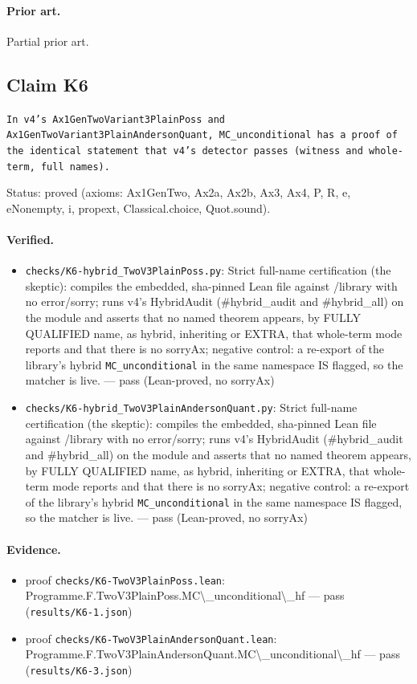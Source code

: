 \documentclass{article}
\begin{document}
\paragraph{Prior art.} Partial prior art.

\subsection*{Claim K6}

\texttt{In v4's Ax1GenTwoVariant3PlainPoss and Ax1GenTwoVariant3PlainAndersonQuant, MC\_unconditional has a proof of the identical statement that v4's detector passes (witness and whole-term, full names).}

Status: proved (axioms: Ax1GenTwo, Ax2a, Ax2b, Ax3, Ax4, P, R, e, eNonempty, i, propext, Classical.choice, Quot.sound).

\paragraph{Verified.}
\begin{itemize}
\item \texttt{checks/K6-hybrid\_TwoV3PlainPoss.py}: Strict full-name certification (the skeptic): compiles the embedded, sha-pinned Lean file against /library with no error/sorry; runs v4's HybridAudit (\#hybrid\_audit and \#hybrid\_all) on the module and asserts that no named theorem appears, by FULLY QUALIFIED name, as hybrid, inheriting or EXTRA, that whole-term mode reports and that there is no sorryAx; negative control: a re-export of the library's hybrid \texttt{MC\_unconditional} in the same namespace IS flagged, so the matcher is live. --- pass (Lean-proved, no sorryAx)
\item \texttt{checks/K6-hybrid\_TwoV3PlainAndersonQuant.py}: Strict full-name certification (the skeptic): compiles the embedded, sha-pinned Lean file against /library with no error/sorry; runs v4's HybridAudit (\#hybrid\_audit and \#hybrid\_all) on the module and asserts that no named theorem appears, by FULLY QUALIFIED name, as hybrid, inheriting or EXTRA, that whole-term mode reports and that there is no sorryAx; negative control: a re-export of the library's hybrid \texttt{MC\_unconditional} in the same namespace IS flagged, so the matcher is live. --- pass (Lean-proved, no sorryAx)
\end{itemize}

\paragraph{Evidence.}
\begin{itemize}
\item proof \texttt{checks/K6-TwoV3PlainPoss.lean}: Programme.F.TwoV3PlainPoss.MC\textbackslash{}\_unconditional\textbackslash{}\_hf --- pass (\texttt{results/K6-1.json})
\item proof \texttt{checks/K6-TwoV3PlainAndersonQuant.lean}: Programme.F.TwoV3PlainAndersonQuant.MC\textbackslash{}\_unconditional\textbackslash{}\_hf --- pass (\texttt{results/K6-3.json})
\end{itemize}
\end{document}
